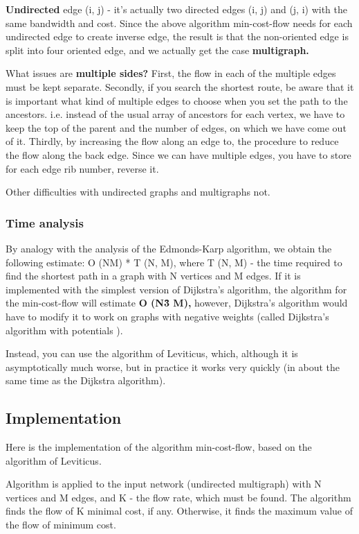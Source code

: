 \textbf{Undirected} edge (i, j) - it's actually two directed edges (i, j) and (j, i) with the same bandwidth and cost. Since the above algorithm min-cost-flow needs for each undirected edge to create inverse edge, the result is that the non-oriented edge is split into four oriented edge, and we actually get the case \textbf{multigraph.}

What issues are \textbf{multiple sides?} First, the flow in each of the multiple edges must be kept separate. Secondly, if you search the shortest route, be aware that it is important what kind of multiple edges to choose when you set the path to the ancestors. i.e. instead of the usual array of ancestors for each vertex, we have to keep the top of the parent and the number of edges, on which we have come out of it. Thirdly, by increasing the flow along an edge to, the procedure to reduce the flow along the back edge. Since we can have multiple edges, you have to store for each edge rib number, reverse it.

Other difficulties with undirected graphs and multigraphs not.

\subsubsection{ Time analysis }
By analogy with the analysis of the Edmonds-Karp algorithm, we obtain the following estimate: O (NM) * T (N, M), where T (N, M) - the time required to find the shortest path in a graph with N vertices and M edges. If it is implemented with the simplest version of Dijkstra's algorithm, the algorithm for the min-cost-flow will estimate \textbf{O (N\^3 M),} however, Dijkstra's algorithm would have to modify it to work on graphs with negative weights (called Dijkstra's algorithm with potentials ).

Instead, you can use the algorithm of Leviticus, which, although it is asymptotically much worse, but in practice it works very quickly (in about the same time as the Dijkstra algorithm).

\subsection{ Implementation }
Here is the implementation of the algorithm min-cost-flow, based on the algorithm of Leviticus.

Algorithm is applied to the input network (undirected multigraph) with N vertices and M edges, and K - the flow rate, which must be found. The algorithm finds the flow of K minimal cost, if any. Otherwise, it finds the maximum value of the flow of minimum cost.

